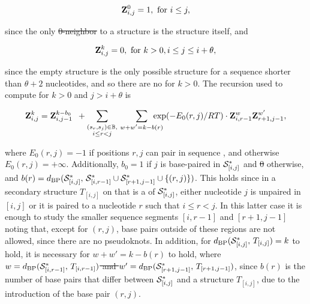 \documentclass[11pt, oneside]{Thesis} %
\providecommand{\DIFadd}[1]{{\protect\color{blue}\uwave{#1}}} %
\providecommand{\DIFdel}[1]{{\protect\color{red}\sout{#1}}}                      %
\providecommand{\DIFaddbegin}{} %
\providecommand{\DIFaddend}{} %
\providecommand{\DIFdelbegin}{} %
\providecommand{\DIFdelend}{} %
\begin{document}
\begin{align}
\label{eq:fftbor:initZpart1}
\bfZ{0}{i,j} = 1, \text{ for } i \le j,
\end{align}

since the only \DIFdelbegin \DIFdel{0-neighbor }\DIFdelend \DIFaddbegin \DIFadd{$0$-neighbor }\DIFaddend to a structure \strSt
is the structure \strSt itself, and

\begin{align}
\label{eq:fftbor:initZpart2}
\bfZ{k}{i,j} = 0, \text{ for } k > 0, i \le j \leq i + \theta,
\end{align}

since the empty structure is the only possible structure for a
sequence shorter than $\theta + 2$ nucleotides, and so there are no
\kNbrs for $k>0$. The recursion used to compute
 for $k > 0$ and $j > i+\theta$ is

\begin{align}
\label{eq:fftbor:bfZkij}
\bfZ{k}{i,j} = \bfZ{k-b_0}{i,j-1}\enspace +
\sum_{\substack{(s_r,s_j) \in \bpSet, \\ i \leq r<j}}\qquad
\sum_{\mathclap{w+w'=k-b(r)}}\enspace
\exp(-E_0(r,j)/RT) \cdot \bfZ{w}{i,r-1} \bfZ{w'}{r+1,j-1},
\end{align}

where $E_0(r,j) = -1$ if positions $r,j$ can pair in sequence \seq,
and otherwise $E_0(r,j) = +\infty$. Additionally,
$b_0 = 1$ if $j$ is base-paired
in $\mathcal S^*_{[i,j]}$ and \DIFdelbegin \DIFdel{0 }\DIFdelend \DIFaddbegin \DIFadd{$0$ }\DIFaddend otherwise, and
$b(r)=d_{\text{BP}}(\mathcal S^*_{[i,j]},\,\mathcal S^*_{[i,r-1]} \cup \mathcal S^*_{[r+1,j-1]} \cup\{(r,j)\})$.
This holds since in a secondary
structure \DIFdelbegin \DIFdel{$T_{[i,j]}$ }\DIFdelend \DIFaddbegin \DIFadd{$\strT_{[i,j]}$ }\DIFaddend on \seqIJ that is a \kNbr of
$\mathcal S^*_{[i,j]}$,
either nucleotide $j$ is unpaired in $[i,j]$ or it is
paired to a nucleotide $r$ such that $i \leq r < j$. In this
latter case it is enough to study the smaller sequence segments
$[i,r-1]$ and $[r+1,j-1]$ noting that, except for $(r,j)$,
base pairs outside of these regions are not allowed, since there
are no pseudoknots. In addition,
for \DIFdelbegin \DIFdel{$d_{\text{BP}}(\mathcal S^*_{[i,j]},\,T_{[i,j]}) = k$ }\DIFdelend \DIFaddbegin \DIFadd{$\dBP{\strSt_{[i,j]}}{\strT_{[i,j]}} = k$ }\DIFaddend to hold,
it is necessary for $w+w' = k -b(r)$ to hold, where \DIFdelbegin \DIFdel{$w =
d_{\text{BP}}(\mathcal S^*_{[i,r-1]},\,T_{[i,r-1]})$ and $w' =
d_{\text{BP}}(\mathcal S^*_{[r+1,j-1]},\,T_{[r+1,j-1]})$}\DIFdelend \DIFaddbegin \DIFadd{$w =
\dBP{\strSt_{[i,r-1]}}{\strT_{[i,r-1]}}$ and $w' =
\dBP{\strSt_{[r+1,j-1]}}{\strT_{[r+1,j-1]}}$}\DIFaddend , since $b(r)$ is the
number of base pairs that differ between $\mathcal S^*_{[i,j]}$ and a
structure \DIFdelbegin \DIFdel{$T_{[i,j]}$}\DIFdelend \DIFaddbegin \DIFadd{$\strT_{[i,j]}$}\DIFaddend , due to the introduction of the base pair
$(r,j)$.
\end{document}
